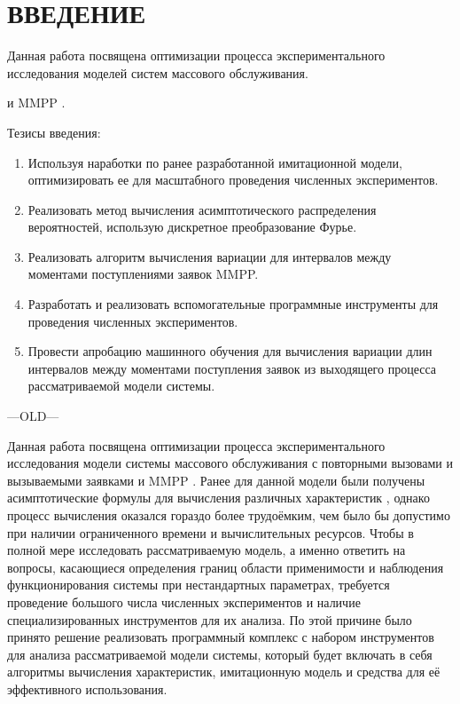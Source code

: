 \section*{ВВЕДЕНИЕ}

Данная работа посвящена оптимизации процесса экспериментального исследования моделей систем массового обслуживания.

 \cite{phung2019retrial} и MMPP \cite{baiocchi1993steady,2019asymptotic,meier1987fitting}.


\cite{задорожный2011методы}


Тезисы введения:
\begin{enumerate}
	\item Используя наработки по ранее разработанной имитационной модели, оптимизировать ее для масштабного проведения численных экспериментов.
	\item Реализовать метод вычисления асимптотического распределения вероятностей, использую дискретное преобразование Фурье. 
	\item Реализовать алгоритм вычисления вариации для интервалов между моментами поступлениями заявок MMPP.
	\item Разработать и реализовать вспомогательные программные инструменты для проведения численных экспериментов.
	\item Провести апробацию машинного обучения для вычисления вариации длин интервалов между моментами поступления заявок из выходящего процесса рассматриваемой модели системы.
\end{enumerate}


---OLD---

Данная работа посвящена оптимизации процесса экспериментального исследования модели системы массового обслуживания с повторными вызовами и вызываемыми заявками \cite{phung2019retrial} и MMPP \cite{baiocchi1993steady,2019asymptotic,meier1987fitting}. Ранее для данной модели были получены асимптотические формулы для вычисления различных характеристик \cite{blaginin2020two,blaginin2021approximation}, однако процесс вычисления оказался гораздо более трудоёмким, чем было бы допустимо при наличии ограниченного времени и вычислительных ресурсов. Чтобы в полной мере исследовать рассматриваемую модель, а именно ответить на вопросы, касающиеся определения границ области применимости и наблюдения функционирования системы при нестандартных параметрах, требуется проведение большого числа численных экспериментов и наличие специализированных инструментов для их анализа. По этой причине было принято решение реализовать программный комплекс с набором инструментов для анализа рассматриваемой модели системы, который будет включать в себя алгоритмы вычисления характеристик, имитационную модель и средства для её эффективного использования.

